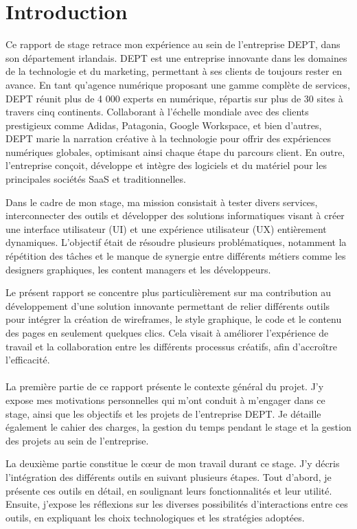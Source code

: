 \chapter{Introduction}
Ce rapport de stage retrace mon expérience au sein de l'entreprise DEPT, dans son département irlandais. DEPT est une entreprise innovante dans les domaines de la technologie et du marketing, permettant à ses clients de toujours rester en avance. En tant qu'agence numérique proposant une gamme complète de services, DEPT réunit plus de 4 000 experts en numérique, répartis sur plus de 30 sites à travers cinq continents. Collaborant à l'échelle mondiale avec des clients prestigieux comme Adidas, Patagonia, Google Workspace, et bien d'autres, DEPT marie la narration créative à la technologie pour offrir des expériences numériques globales, optimisant ainsi chaque étape du parcours client. En outre, l'entreprise conçoit, développe et intègre des logiciels et du matériel pour les principales sociétés SaaS et traditionnelles.

Dans le cadre de mon stage, ma mission consistait à tester divers services, interconnecter des outils et développer des solutions informatiques visant à créer une interface utilisateur (UI) et une expérience utilisateur (UX) entièrement dynamiques. L'objectif était de résoudre plusieurs problématiques, notamment la répétition des tâches et le manque de synergie entre différents métiers comme les designers graphiques, les content managers et les développeurs.

Le présent rapport se concentre plus particulièrement sur ma contribution au développement d'une solution innovante permettant de relier différents outils pour intégrer la création de wireframes, le style graphique, le code et le contenu des pages en seulement quelques clics. Cela visait à améliorer l'expérience de travail et la collaboration entre les différents processus créatifs, afin d'accroître l'efficacité.
\\ \\
La première partie de ce rapport présente le contexte général du projet. J'y expose mes motivations personnelles qui m'ont conduit à m'engager dans ce stage, ainsi que les objectifs et les projets de l'entreprise DEPT. Je détaille également le cahier des charges, la gestion du temps pendant le stage et la gestion des projets au sein de l'entreprise.


La deuxième partie constitue le cœur de mon travail durant ce stage. J'y décris l'intégration des différents outils en suivant plusieurs étapes. Tout d'abord, je présente ces outils en détail, en soulignant leurs fonctionnalités et leur utilité. Ensuite, j'expose les réflexions sur les diverses possibilités d'interactions entre ces outils, en expliquant les choix technologiques et les stratégies adoptées.

